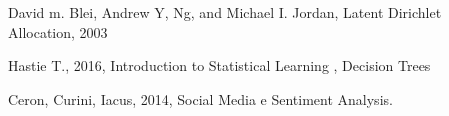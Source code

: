 \documentclass[runningheads]{llncs}
\begin{document}
\begin{thebibliography}{9}

David m. Blei, Andrew Y, Ng, and Michael I. Jordan, Latent Dirichlet Allocation, 2003

Hastie T., 2016, Introduction to Statistical Learning , Decision Trees
 
Ceron, Curini, Iacus, 2014,  Social Media e Sentiment Analysis. 
 

\end{thebibliography}
\end{document}
